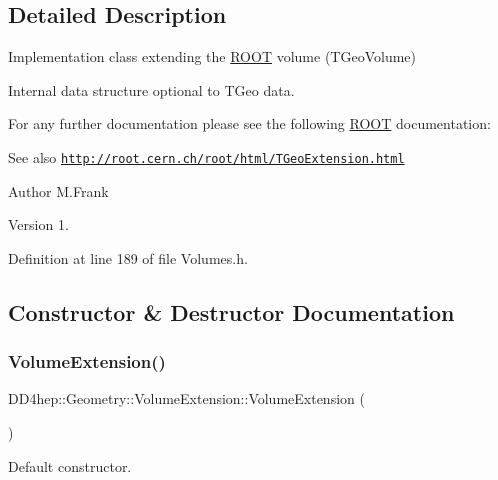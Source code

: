 \subsection{Detailed Description}
Implementation class extending the \hyperlink{namespace_r_o_o_t}{R\+O\+OT} volume (T\+Geo\+Volume) 

Internal data structure optional to T\+Geo data.

For any further documentation please see the following \hyperlink{namespace_r_o_o_t}{R\+O\+OT} documentation\+: \begin{DoxySeeAlso}{See also}
\href{http://root.cern.ch/root/html/TGeoExtension.html}{\tt http\+://root.\+cern.\+ch/root/html/\+T\+Geo\+Extension.\+html}
\end{DoxySeeAlso}
\begin{DoxyAuthor}{Author}
M.\+Frank 
\end{DoxyAuthor}
\begin{DoxyVersion}{Version}
1. 
\end{DoxyVersion}


Definition at line 189 of file Volumes.\+h.



\subsection{Constructor \& Destructor Documentation}
\hypertarget{class_d_d4hep_1_1_geometry_1_1_volume_extension_aa9342f53440b4c2c5e56c848868368a5}{}\label{class_d_d4hep_1_1_geometry_1_1_volume_extension_aa9342f53440b4c2c5e56c848868368a5} 
\subsubsection{\texorpdfstring{Volume\+Extension()}{VolumeExtension()}}
{\footnotesize\ttfamily D\+D4hep\+::\+Geometry\+::\+Volume\+Extension\+::\+Volume\+Extension (\begin{DoxyParamCaption}{ }\end{DoxyParamCaption})}



Default constructor. 

\hypertarget{class_d_d4hep_1_1_geometry_1_1_volume_extension_a86b8adbb7fefd161d386f958db8b9be4}{}\label{class_d_d4hep_1_1_geometry_1_1_volume_extension_a86b8adbb7fefd161d386f958db8b9be4} 
